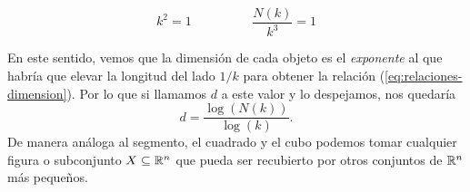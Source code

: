 \begin{equation}
{k^2}=1 \hspace{2cm} \frac{N(k)}{k^3}=1
\end{equation}

En este sentido, vemos que la dimensión de cada objeto es el \textit{exponente} al que habría que elevar la longitud del lado $1/k$ para obtener la relación (\ref{eq:relaciones-dimension}). Por lo que si llamamos $d$ a este valor y lo despejamos, nos quedaría
$$
d=\dfrac{\log(N(k))}{\log(k)}.
$$
De manera análoga al segmento, el cuadrado y el cubo podemos tomar cualquier figura o subconjunto $X\subseteq \mathbb{R}^n$ que pueda ser recubierto por otros conjuntos de $\mathbb{R}^n$ más pequeños.

